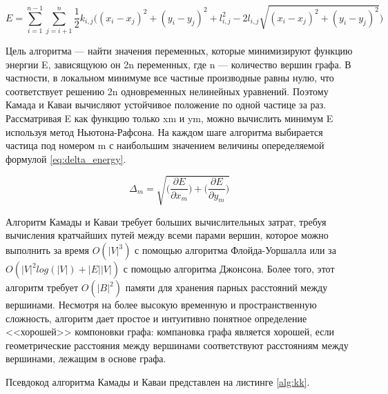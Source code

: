 \documentclass[14pt, russian]{scrartcl}
\begin{document}
\begin{equation}\label{eq:energy_extendet}
  E = \sum_{i = 1}^{n - 1}\sum_{j = i + 1}^{n}{\frac{1}{2}k_{i, j}\bigg( (x_i - x_j)^2 + (y_i - y_j)^2 + l^2_{i, j} - 2 l_{i, j}\sqrt{(x_i - x_j)^2 + (y_i - y_j)^2} \bigg)}
\end{equation} 


Цель алгоритма --- найти значения переменных, которые минимизируют функцию энергии E, зависящуюю он 2n переменных, где n --- количество вершин графа. В частности, в локальном минимуме все частные производные равны нулю, что соответствует решению 2n одновременных нелинейных уравнений. Поэтому Камада и Каваи вычисляют устойчивое положение по одной частице за раз. Рассматривая E как функцию только xm и ym, можно вычислить минимум E используя метод Ньютона-Рафсона. На каждом шаге алгоритма выбирается частица под номером m с наибольшим значением величины опеределяемой формулой \ref{eq:delta_energy}.

\begin{equation}\label{eq:delta_energy}
  \Delta_m = \sqrt{\bigg( \frac{\partial E}{\partial x_m} \bigg) + \bigg(  \frac{\partial E}{\partial y_m} \bigg)}
\end{equation} 

Алгоритм Камады и Каваи требует больших вычислительных затрат, требуя вычисления кратчайших путей между всеми парами вершин, которое можно выполнить за время $O(|V|^3)$ с помощью алгоритма Флойда-Уоршалла или за $O(|V|^2 log(|V|)  + |E||V|)$ с помощью алгоритма Джонсона. Более того, этот алгоритм требует $O(|B|^2)$ памяти для хранения парных расстояний между вершинами. Несмотря на более высокую временную и пространственную сложность, алгоритм дает простое и интуитивно понятное определение <<хорошей>>
компоновки графа: компановка графа является хорошей, если геометрические расстояния между вершинами соответствуют расстояниям между вершинами, лежащим в основе графа.

Псевдокод алгоритма Камады и Каваи представлен на листинге \ref{alg:kk}.
\end{document}
